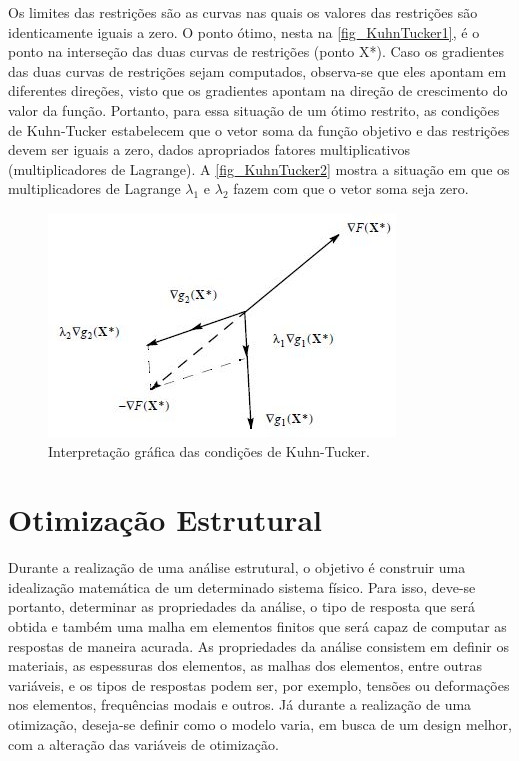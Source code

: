 Os limites das restrições são as curvas nas quais os valores das restrições são identicamente iguais a zero. O ponto ótimo, nesta na \autoref{fig_KuhnTucker1}, é o ponto na interseção das duas curvas de restrições (ponto X*). Caso os gradientes das duas curvas de restrições sejam computados, observa-se que eles apontam em diferentes direções, visto que os gradientes apontam na direção de crescimento do valor da função. Portanto, para essa situação de um ótimo restrito, as condições de Kuhn-Tucker estabelecem que o vetor soma da função objetivo e das restrições devem ser iguais a zero, dados apropriados fatores multiplicativos (multiplicadores de Lagrange). A \autoref{fig_KuhnTucker2} mostra a situação em que os multiplicadores de Lagrange $\lambda_1$ e $\lambda_2$ fazem com que o vetor soma seja zero.

\begin{figure}[h]
	\caption{\label{fig_KuhnTucker2}Interpretação gráfica das condições de Kuhn-Tucker.}
  \centering
  \includegraphics[scale=1.0]{figura/KuhnTucker2}
\end{figure}

\section{Otimização Estrutural}
Durante a realização de uma análise estrutural, o objetivo é construir uma idealização matemática de um determinado sistema físico. Para isso, deve-se portanto, determinar as propriedades da análise, o tipo de resposta que será obtida e também uma malha em elementos finitos que será capaz de computar as respostas de maneira acurada. As propriedades da análise consistem em definir os materiais, as espessuras dos elementos, as malhas dos elementos, entre outras variáveis, e os tipos de respostas podem ser, por exemplo, tensões ou deformações nos elementos, frequências modais e outros. Já durante a realização de uma otimização, deseja-se definir como o modelo varia, em busca de um design melhor, com a alteração das variáveis de otimização.

